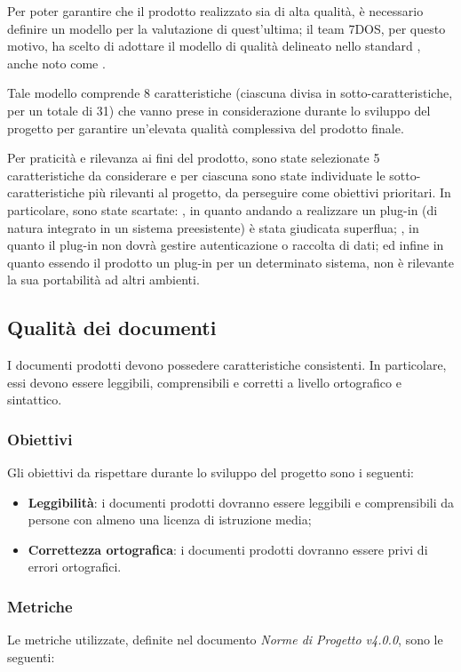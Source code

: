 Per poter garantire che il prodotto realizzato sia di alta qualità, è necessario definire un modello per la valutazione di quest'ultima; il team 7DOS, per questo motivo, ha scelto di adottare il modello di qualità delineato nello standard , anche noto come .

Tale modello comprende 8 caratteristiche (ciascuna divisa in sotto-caratteristiche, per un totale di 31) che vanno prese in considerazione durante lo sviluppo del progetto per garantire un'elevata qualità complessiva del prodotto finale.

Per praticità e rilevanza ai fini del prodotto, sono state selezionate 5 caratteristiche da considerare e per ciascuna sono state individuate le sotto-caratteristiche più rilevanti al progetto, da perseguire come obiettivi prioritari. In particolare, sono state scartate: , in quanto andando a realizzare un plug-in (di natura integrato in un sistema preesistente) è stata giudicata superflua; , in quanto il plug-in non dovrà gestire autenticazione o raccolta di dati; ed infine  in quanto essendo il prodotto un plug-in per un determinato sistema, non è rilevante la sua portabilità ad altri ambienti.

\subsection{Qualità dei documenti}
I documenti prodotti devono possedere caratteristiche consistenti. In particolare, essi devono essere leggibili, comprensibili e corretti a livello ortografico e sintattico.
\subsubsection{Obiettivi}
Gli obiettivi da rispettare durante lo sviluppo del progetto sono i seguenti:
	\begin{itemize}
		\item{\textbf{Leggibilità}: i documenti prodotti dovranno essere leggibili e comprensibili da persone con almeno una licenza di istruzione media;}
		\item{\textbf{Correttezza ortografica}: i documenti prodotti dovranno essere privi di errori ortografici.}
	\end{itemize}

\subsubsection{Metriche} 
Le metriche utilizzate, definite nel documento \emph{Norme di Progetto v4.0.0}, sono le seguenti:

